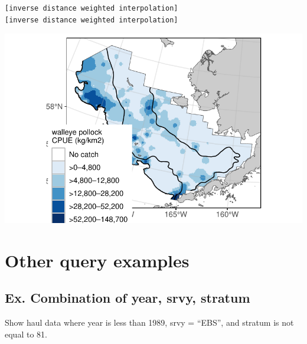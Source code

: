 \documentclass[
  letterpaper,
  oneside,
  open=any]{scrbook}
\newenvironment{Shaded}{\begin{snugshade}}{\end{snugshade}}
\newcommand{\AttributeTok}[1]{\textcolor[rgb]{0.40,0.45,0.13}{#1}}
\newcommand{\CommentTok}[1]{\textcolor[rgb]{0.37,0.37,0.37}{#1}}
\newcommand{\FunctionTok}[1]{\textcolor[rgb]{0.28,0.35,0.67}{#1}}
\newcommand{\NormalTok}[1]{\textcolor[rgb]{0.00,0.23,0.31}{#1}}
\newcommand{\SpecialCharTok}[1]{\textcolor[rgb]{0.37,0.37,0.37}{#1}}
\newcommand{\StringTok}[1]{\textcolor[rgb]{0.13,0.47,0.30}{#1}}
\begin{document}
\begin{verbatim}
[inverse distance weighted interpolation]
[inverse distance weighted interpolation]
\end{verbatim}

\begin{Shaded}
\end{Shaded}

\includegraphics{content/foss-api-r_files/figure-pdf/pollock-multi2-loc-1.pdf}

\section{Other query examples}\label{other-query-examples}

\subsection{Ex. Combination of year, srvy,
stratum}\label{ex.-combination-of-year-srvy-stratum}

Show haul data where year is less than 1989, srvy = ``EBS'', and stratum
is not equal to 81.
\end{document}
